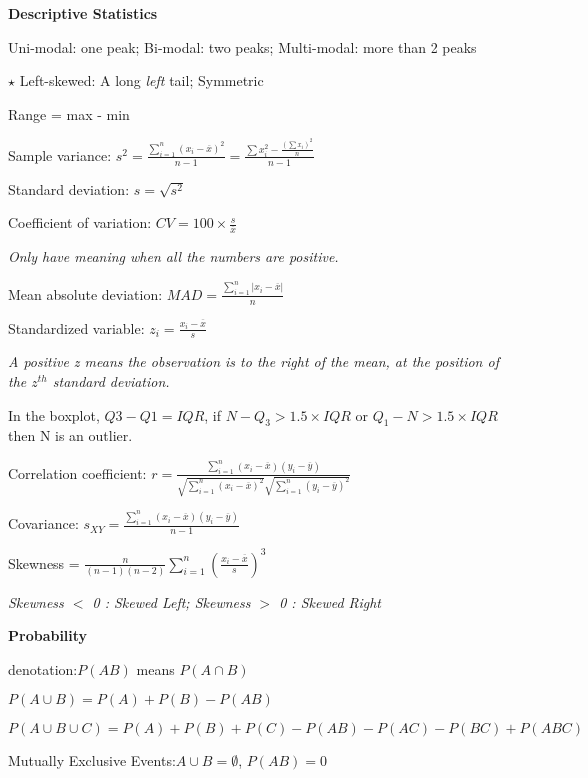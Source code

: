 \documentclass{article}
\newcommand{\bigtitle}[1]{
	\noindent
	\textbf{#1}
}
\begin{document}
	\twocolumn
	
	
	
	\bigtitle{Descriptive Statistics}
	
	Uni-modal: one peak; Bi-modal: two peaks; Multi-modal: more than 2 peaks
	
	$\star$ Left-skewed: A long \textit{left} tail; 
	Symmetric
	
	Range = max - min
	
	
	
	Sample variance: $s^2 = \frac{\sum \limits_{i=1}^{n}(x_i-\overline{x})^2}{n-1}=\frac{\sum x_i^2 - \frac{(\sum x_i)^2}{n}}{n-1}$
	
	Standard deviation: $s = \sqrt{s^2}$
	
	
	
	Coefficient of variation: $CV = 100\times\frac{s}{\overline{x}}$
	
	\textit{Only have meaning when all the numbers are positive.}
	
	Mean absolute deviation: $MAD = \frac{\sum \limits_{i=1}^{n}\left|x_i-\overline{x}\right|}{n}$
	
	Standardized variable: $z_i = \frac{x_i-\overline{x}}{s}$
	
	\textit{A positive z means the observation is to the right of the mean, at the position of the $z^{th}$ standard deviation.}
	
	In the boxplot, $Q3-Q1 = IQR$, if $N - Q_3 > 1.5 \times IQR$ or $Q_1 - N >1.5 \times IQR$ then N is an outlier.
	
	Correlation coefficient: $r = \frac{\sum_{i=1}^{n}(x_i-\overline{x})(y_i-\overline{y})}{\sqrt{\sum_{i=1}^{n}(x_i-\overline{x})^2}\sqrt{\sum_{i=1}^{n}(y_i-\overline{y})^2}}$
	
	Covariance: $s_{XY} = \frac{\sum_{i=1}^{n}(x_i-\overline{x})(y_i-\overline{y})}{n-1}$
	
	Skewness = $\frac{n}{(n-1)(n-2)}\sum \limits_{i=1}^{n}(\frac{x_i-\overline{x}}{s})^3$
	
	\textit{Skewness $<$ 0 : Skewed Left; Skewness $>$ 0 : Skewed Right}
	
	
	
	
	\bigtitle{Probability}
	
	denotation:$P(AB)$ means $P(A\cap B)$
	
	$P(A\cup B) = P(A)+P(B)-P(AB)$
	
	$P(A\cup B\cup C) = P(A)+P(B)+P(C) - P(AB) - P(AC) - P(BC) + P(ABC)$
	
	Mutually Exclusive Events:$A\cup B = \emptyset$, $P(AB) = 0$
	
\end{document}
